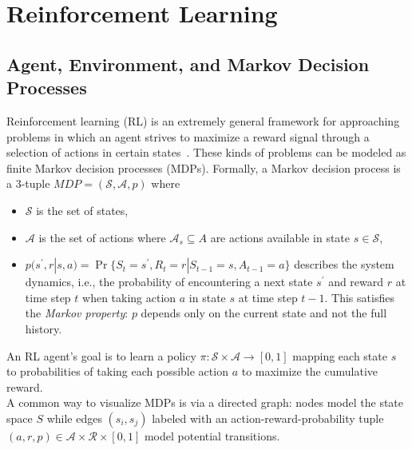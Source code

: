 
\section{Reinforcement Learning}\label{sec:reinforcement-learning}


\subsection{Agent, Environment, and Markov Decision Processes}\label{sec:rl-mdp}

Reinforcement learning (RL) is an extremely general framework for approaching problems
in which an agent strives to maximize a reward signal through a selection of actions
in certain states~\cite{sutton_reinforcement_2020}.
These kinds of problems can be modeled as finite Markov decision processes (MDPs).
Formally, a Markov decision process is a 3-tuple $MDP=(\mathcal{S},\mathcal{A},p)$ where

\begin{itemize}
  \item $\mathcal{S}$ is the set of states,
  \item $\mathcal{A}$ is the set of actions where $\mathcal{A}_s\subseteq A$ are actions available in state $s\in\mathcal{S}$,
  \item $p(s^\prime,r|s,a)=\Pr\{S_t=s^\prime, R_t=r|S_{t-1}=s, A_{t-1}=a\}$
    describes the system dynamics, i.e., the probability of encountering a next
    state $s^\prime$ and reward $r$ at time step $t$ when taking action $a$ in
    state $s$ at time step $t-1$. This satisfies the \emph{Markov property}:
    $p$ depends only on the current state and not the full history.
\end{itemize}

An RL agent's goal is to learn a policy $\pi:\mathcal{S}\times\mathcal{A}\rightarrow [0,1]$
mapping each state $s$ to probabilities of taking each possible action $a$ to maximize
the cumulative reward.\\

A common way to visualize MDPs is via a directed graph: nodes model the state
space $S$ while edges $(s_i,s_j)$ labeled with an action-reward-probability
tuple $(a,r,p)\in\mathcal{A}\times\mathcal{R}\times[0,1]$ model potential
transitions.


